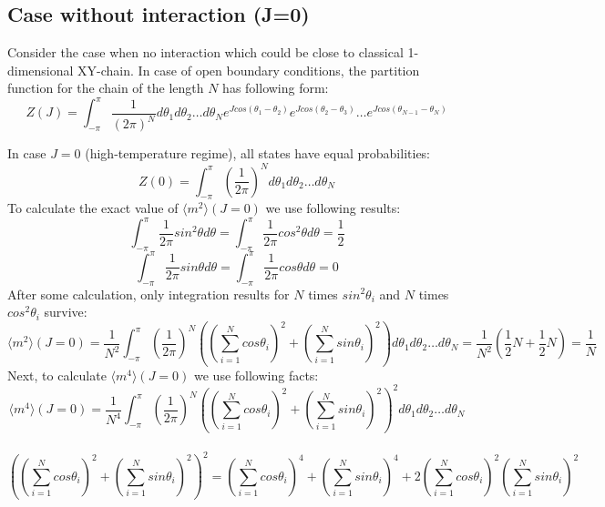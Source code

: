 \subsection{Case without interaction (J=0)} \label{U4J0}

Consider the case when no interaction which could be close to classical 1-dimensional XY-chain. In case of open boundary conditions, the partition function for the chain of the length $N$ has following form:  
\begin{equation}
\label{partitionfunction_free}
Z(J) =    \int_{-\pi}^{\pi} \frac{1}{ (2 \pi  )^N}       d \theta_1 d \theta_2 \dots d\theta_N
e ^{Jcos(\theta_1-\theta_2)} e ^{Jcos(\theta_2-\theta_3)} \dots 
e ^{Jcos(\theta_{N-1}-\theta_N)} %
\end{equation}

In case $J=0$ (high-temperature regime), all states have equal probabilities:
\begin{equation}
\label{paritionfunction_free_zero}
Z(0) =  %
\int_{-\pi}^{\pi} (\frac{1}{2 \pi})^N   d \theta_1 d \theta_2 \dots d\theta_N 
\end{equation}
To calculate the exact value of $\langle m^2 \rangle (J=0)$  we use following results: 
\begin{equation*} 
 \int_{-\pi}^{\pi}  \frac{1}{2 \pi} sin^2 \theta d \theta =\int_{-\pi}^{\pi}  \frac{1}{2 \pi} cos^2 \theta d \theta = \frac{1}{2} 
\end{equation*}
 \begin{equation*} \int_{-\pi}^{\pi}  \frac{1}{2 \pi} sin \theta d \theta  =\int_{-\pi}^{\pi}  \frac{1}{2 \pi} cos  \theta d \theta = 0 \end{equation*}
   After some calculation, only integration results for $N$ times $sin^2 \theta_i$ and $N$ times $cos^2 \theta_i$ survive:
\begin{equation} 
\label{m2j0}
  \langle m^2 \rangle (J=0) = \frac{1}{N^2}   \int_{-\pi}^{\pi}  (\frac{1}{2 \pi})^N \left(  
   ( \sum_{i=1}^{N} cos \theta_i )^2 +  (\sum_{i=1}^{N} sin \theta_i  )^2 \right)  d \theta_1 d \theta_2 \dots d\theta_N =
  \frac{1}{N^2}  (\frac{1}{2}N +\frac{1}{2}N)   = \frac{1}{N}
\end{equation}
Next, to calculate $\langle m^4 \rangle (J=0)$ we use following facts: 
\begin{equation*}
\langle m^4 \rangle (J=0) = \frac{1}{N^4}   \int_{-\pi}^{\pi}  (\frac{1}{2 \pi})^N \left(  
( \sum_{i=1}^{N} cos \theta_i )^2 +  (\sum_{i=1}^{N} sin \theta_i  )^2 \right)^2 d \theta_1 d \theta_2 \dots d\theta_N  
\end{equation*} \\ 
\begin{equation*}
 \left(  
( \sum_{i=1}^{N} cos \theta_i )^2 +  (\sum_{i=1}^{N} sin \theta_i  )^2 \right)^2 =  (\sum_{i=1}^{N} cos \theta_i )^4 + (\sum_{i=1}^{N} sin \theta_i )^4 + 2 ( \sum_{i=1}^{N} cos \theta_i )^2( \sum_{i=1}^{N} sin \theta_i )^2 
\end{equation*} \\

